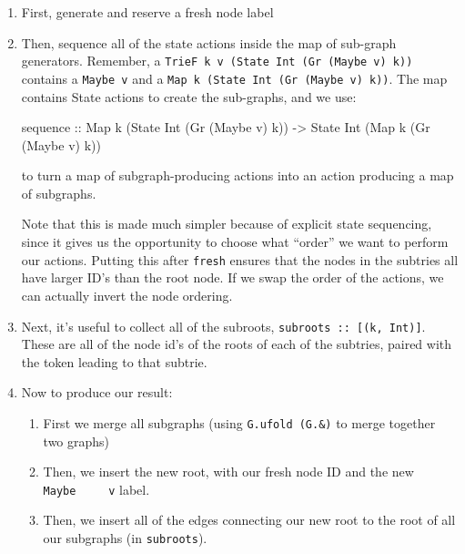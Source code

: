 \documentclass[]{article}
\newenvironment{Shaded}{}{}
\newcommand{\DataTypeTok}[1]{\textcolor[rgb]{0.56,0.13,0.00}{#1}}
\newcommand{\FunctionTok}[1]{\textcolor[rgb]{0.02,0.16,0.49}{#1}}
\newcommand{\NormalTok}[1]{#1}
\newcommand{\OtherTok}[1]{\textcolor[rgb]{0.00,0.44,0.13}{#1}}
\begin{document}
\begin{enumerate}
\def\labelenumi{\arabic{enumi}.}
\item
  First, generate and reserve a fresh node label
\item
  Then, sequence all of the state actions inside the map of sub-graph
  generators. Remember, a
  \texttt{TrieF\ k\ v\ (State\ Int\ (Gr\ (Maybe\ v)\ k))} contains a
  \texttt{Maybe\ v} and a \texttt{Map\ k\ (State\ Int\ (Gr\ (Maybe\ v)\ k))}.
  The map contains State actions to create the sub-graphs, and we use:

\begin{Shaded}
\begin{Highlighting}[]
\FunctionTok{sequence}
\OtherTok{    ::} \DataTypeTok{Map}\NormalTok{ k (}\DataTypeTok{State} \DataTypeTok{Int}\NormalTok{ (}\DataTypeTok{Gr}\NormalTok{ (}\DataTypeTok{Maybe}\NormalTok{ v) k))}
    \OtherTok{{-}\textgreater{}} \DataTypeTok{State} \DataTypeTok{Int}\NormalTok{ (}\DataTypeTok{Map}\NormalTok{ k (}\DataTypeTok{Gr}\NormalTok{ (}\DataTypeTok{Maybe}\NormalTok{ v) k))}
\end{Highlighting}
\end{Shaded}

  to turn a map of subgraph-producing actions into an action producing a map of
  subgraphs.

  Note that this is made much simpler because of explicit state sequencing,
  since it gives us the opportunity to choose what ``order'' we want to perform
  our actions. Putting this after \texttt{fresh} ensures that the nodes in the
  subtries all have larger ID's than the root node. If we swap the order of the
  actions, we can actually invert the node ordering.
\item
  Next, it's useful to collect all of the subroots,
  \texttt{subroots\ ::\ {[}(k,\ Int){]}}. These are all of the node id's of the
  roots of each of the subtries, paired with the token leading to that subtrie.
\item
  Now to produce our result:

  \begin{enumerate}
  \def\labelenumii{\alph{enumii}.}
  \tightlist
  \item
    First we merge all subgraphs (using \texttt{G.ufold\ (G.\&)} to merge
    together two graphs)
  \item
    Then, we insert the new root, with our fresh node ID and the new
    \texttt{Maybe\ \ \ \ \ v} label.
  \item
    Then, we insert all of the edges connecting our new root to the root of all
    our subgraphs (in \texttt{subroots}).
  \end{enumerate}
\end{enumerate}
\end{document}
